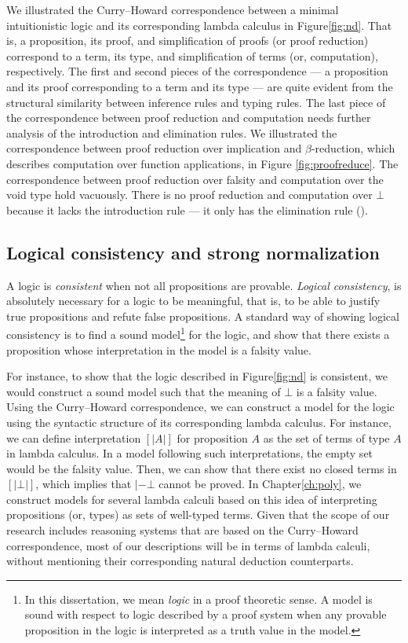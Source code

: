 We illustrated the Curry--Howard correspondence between
a minimal intuitionistic logic and its corresponding lambda calculus
in Figure\;\ref{fig:nd}. That is, a proposition, its proof, and
simplification of proofs (or proof reduction) correspond to
a term, its type, and simplification of terms (or, computation), respectively.
The first and second pieces of the correspondence --- a proposition and
its proof corresponding to a term and its type --- are quite evident from
the structural similarity between inference rules and typing rules.
The last piece of the correspondence between proof reduction and computation
needs further analysis of the introduction and elimination rules.
We illustrated the correspondence between proof reduction over implication and
$\beta$-reduction, which describes computation over function applications,
in Figure \ref{fig:proofreduce}. The correspondence between
proof reduction over falsity and computation over the void type
hold vacuously. There is no proof reduction and computation over $\bot$
because it lacks the introduction rule --- it only has the elimination rule
().

\subsection{Logical consistency and strong normalization}
A logic is \emph{consistent} when not all propositions are provable.
\emph{Logical consistency}, is absolutely necessary for a logic
to be meaningful, that is, to be able to justify true propositions
and refute false propositions. A standard way of showing logical consistency
is to find a sound model\footnote{In this dissertation, we mean \emph{logic}
        in a proof theoretic sense. A model is sound with respect to logic
        described by a proof system when any provable proposition
        in the logic is interpreted as a truth value in the model.}
for the logic, and show that there exists a proposition
whose interpretation in the model is a falsity value.

For instance, to show that the logic described in Figure\;\ref{fig:nd}
is consistent, we would construct a sound model such that the meaning of $\bot$
is a falsity value. Using the Curry--Howard correspondence, we can construct
a model for the logic using the syntactic structure of its corresponding
lambda calculus. For instance, we can define interpretation $[|A|]$ for
proposition $A$ as the set of terms of type $A$ in lambda calculus.
In a model following such interpretations, the empty set would be
the falsity value.  Then, we can show that there exist no closed terms
in $[|\bot|]$, which implies that $|- \bot$ cannot be proved.
In Chapter\;\ref{ch:poly}, we construct models for several lambda calculi
based on this idea of interpreting propositions (or, types) as sets of
well-typed terms. Given that the scope of our research includes
reasoning systems that are based on the Curry--Howard correspondence,
most of our descriptions will be in terms of lambda calculi, without
mentioning their corresponding natural deduction counterparts.

